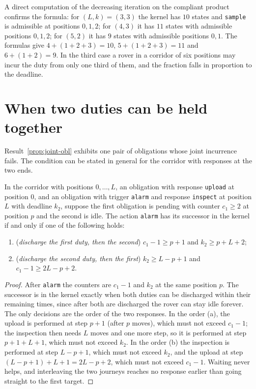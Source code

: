 A direct computation of the decreasing iteration on the compliant product confirms the formula: for $(L,k)=(3,3)$ the kernel has $10$ states and \texttt{sample} is admissible at positions $0,1,2$; for $(4,3)$ it has $11$ states with admissible positions $0,1,2$; for $(5,2)$ it has $9$ states with admissible positions $0,1$. The formulas give $4+(1+2+3)=10$, $5+(1+2+3)=11$ and $6+(1+2)=9$. In the third case a rover in a corridor of six positions may incur the duty from only one third of them, and the fraction falls in proportion to the deadline.

\section{When two duties can be held together}\label{sec:two-duties}

Result~\ref{prop:joint-obl} exhibits one pair of obligations whose joint incurrence fails. The condition can be stated in general for the corridor with responses at the two ends.

\begin{newresult}\label{prop:two-triggers}
In the corridor with positions $0,\dots,L$, an obligation with response \texttt{upload} at position $0$, and an obligation with trigger \texttt{alarm} and response \texttt{inspect} at position $L$ with deadline $k_2$, suppose the first obligation is pending with counter $c_1\ge2$ at position $p$ and the second is idle. The action \texttt{alarm} has its successor in the kernel if and only if one of the following holds:
\begin{enumerate}[nosep,label=(\alph*)]
  \item (\emph{discharge the first duty, then the second}) $c_1-1\ge p+1$ and $k_2\ge p+L+2$;
  \item (\emph{discharge the second duty, then the first}) $k_2\ge L-p+1$ and $c_1-1\ge 2L-p+2$.
\end{enumerate}
\end{newresult}
\begin{proof}
After \texttt{alarm} the counters are $c_1-1$ and $k_2$ at the same position $p$. The successor is in the kernel exactly when both duties can be discharged within their remaining times, since after both are discharged the rover can stay idle forever. The only decisions are the order of the two responses. In the order (a), the upload is performed at step $p+1$ (after $p$ moves), which must not exceed $c_1-1$; the inspection then needs $L$ moves and one more step, so it is performed at step $p+1+L+1$, which must not exceed $k_2$. In the order (b) the inspection is performed at step $L-p+1$, which must not exceed $k_2$, and the upload at step $(L-p+1)+L+1=2L-p+2$, which must not exceed $c_1-1$. Waiting never helps, and interleaving the two journeys reaches no response earlier than going straight to the first target.
\end{proof}

